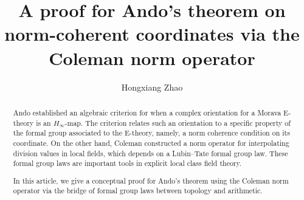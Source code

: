 \documentclass[12pt]{article}
\theoremstyle{definition}
\begin{document}
    \title{A proof for Ando's theorem on norm-coherent coordinates via the Coleman norm operator}
    \author{Hongxiang Zhao}


    \date{}



    
    
    \maketitle
    
    \begin{abstract}
        Ando established an algebraic criterion for when a complex orientation for a Morava E-theory is an $H_\infty$-map. The criterion relates such an orientation to a specific property of the formal group associated to the E-theory, namely, a norm coherence condition on its coordinate. On the other hand, Coleman constructed a norm operator for interpolating division values in local fields, which depends on a Lubin--Tate formal group law. These formal group laws are important tools in explicit local class field theory. \par 
        In this article, we give a conceptual proof for Ando's theorem using the Coleman norm operator via the bridge of formal group laws between topology and arithmetic. 
    \end{abstract}

    \tableofcontents
\end{document}
